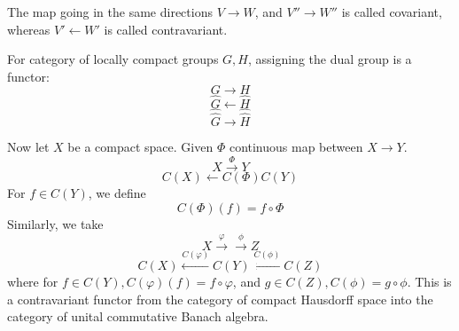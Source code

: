 The map going in the same directions $V\to W$, and $V''\to W''$ is called covariant, whereas $V'\leftarrow W'$ is called contravariant.
\begin{example}
    For category of locally compact groups $G,H$, assigning the dual group is a functor:
    \begin{equation*}
        G\to H
    \end{equation*}
    \begin{equation*}
        \widehat{G}\leftarrow\widehat{H}
    \end{equation*}
    \begin{equation*}
        \widehat{\widehat{G}}\to\widehat{\widehat{H}}
    \end{equation*}
\end{example}
\begin{example}
Now let $X$ be a compact space. Given $\Phi$ continuous map between $X\to Y$.
\begin{equation*}
    X\xrightarrow{\Phi}Y
\end{equation*}
\begin{equation*}
    C(X)\leftarrow{C(\Phi)} C(Y)
\end{equation*}
For $f\in C(Y)$, we define
\begin{equation*}
    C(\Phi)(f)=f\circ\Phi
\end{equation*}
Similarly, we take
\begin{equation*}
    X\xrightarrow{\varphi}\xrightarrow{\phi}Z
\end{equation*}
\begin{equation*}
    C(X)\xleftarrow{C(\varphi)}C(Y)\xleftarrow{C(\phi)}C(Z)
\end{equation*}
where for $f\in C(Y), C(\varphi)(f)=f\circ\varphi$, and $g\in C(Z), C(\phi)=g\circ \phi$. 
This is a contravariant functor from the category of compact Hausdorff space into the category of unital commutative Banach algebra.
\end{example}

